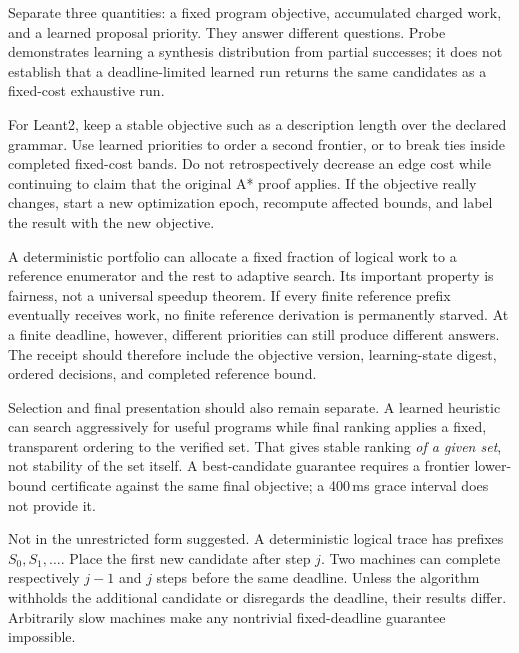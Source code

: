 
\answer Separate three quantities: a fixed program objective, accumulated charged work, and a learned proposal priority. They answer different questions. Probe demonstrates learning a synthesis distribution from partial successes; it does not establish that a deadline-limited learned run returns the same candidates as a fixed-cost exhaustive run.\cite{probe}

For Leant2, keep a stable objective such as a description length over the declared grammar. Use learned priorities to order a second frontier, or to break ties inside completed fixed-cost bands. Do not retrospectively decrease an edge cost while continuing to claim that the original A* proof applies. If the objective really changes, start a new optimization epoch, recompute affected bounds, and label the result with the new objective.

A deterministic portfolio can allocate a fixed fraction of logical work to a reference enumerator and the rest to adaptive search. Its important property is fairness, not a universal speedup theorem. If every finite reference prefix eventually receives work, no finite reference derivation is permanently starved. At a finite deadline, however, different priorities can still produce different answers. The receipt should therefore include the objective version, learning-state digest, ordered decisions, and completed reference bound.

Selection and final presentation should also remain separate. A learned heuristic can search aggressively for useful programs while final ranking applies a fixed, transparent ordering to the verified set. That gives stable ranking \emph{of a given set}, not stability of the set itself. A best-candidate guarantee requires a frontier lower-bound certificate against the same final objective; a 400\,ms grace interval does not provide it.


\answer Not in the unrestricted form suggested. A deterministic logical trace has prefixes $S_0,S_1,\ldots$. Place the first new candidate after step $j$. Two machines can complete respectively $j-1$ and $j$ steps before the same deadline. Unless the algorithm withholds the additional candidate or disregards the deadline, their results differ. Arbitrarily slow machines make any nontrivial fixed-deadline guarantee impossible.

